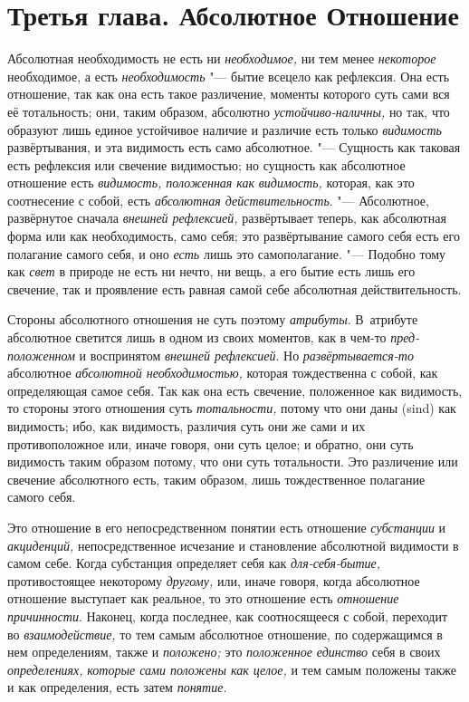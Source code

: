 \chapter[{\em Третья глава} Абсолютное Отношение]{Третья глава. Абсолютное Отношение}

Абсолютная необходимость не есть ни {\em необходимое,} ни тем менее
{\em некоторое} необходимое, а есть
{\em необходимость} "--- бытие всецело как рефлексия. Она
есть отношение, так как она есть такое различение, моменты которого суть
сами вся её тотальность; они, таким образом, абсолютно
{\em устойчиво-наличны,} но так, что образуют лишь
единое устойчивое наличие и различие есть только
{\em видимость} развёртывания, и эта видимость есть
само абсолютное. "--- Сущность как таковая есть рефлексия или свечение
видимостью; но сущность как абсолютное отношение есть
{\em видимость, положенная как
}{\em видимость,} которая, как это соотнесение с собой,
есть {\em абсолютная действительность}. "--- Абсолютное,
развёрнутое сначала {\em внешней рефлексией,}
развёртывает теперь, как абсолютная форма или как необходимость, само себя;
это развёртывание самого себя есть его полагание самого себя, и оно
{\em есть} лишь это самополагание. "--- Подобно тому как
{\em свет} в природе не есть ни нечто, ни вещь, а его
бытие есть лишь его свечение, так и проявление есть равная самой себе
абсолютная действительность.

Стороны абсолютного отношения не суть поэтому {\em атрибуты}. В~атрибуте
абсолютное светится лишь в одном из своих моментов, как в чем-то
{\em пред-положенном} и воспринятом {\em внешней рефлексией}.
Но {\em развёртывается-то} абсолютное {\em абсолютной необходимостью,} которая
тождественна с собой, как определяющая самое себя. Так как она есть свечение,
положенное как видимость, то стороны этого отношения суть {\em тотальности,}
потому что они даны (sind) как видимость; ибо, как видимость, различия суть они
же сами и их противоположное или, иначе говоря, они суть целое; и обратно, они
суть видимость таким образом потому, что они суть тотальности. Это различение
или свечение абсолютного есть, таким образом, лишь тождественное полагание
самого себя.

Это отношение в его непосредственном понятии есть отношение
{\em субстанции} и {\em акциденций,} непосредственное исчезание и
становление абсолютной видимости в самом себе. Когда субстанция определяет
себя как {\em для-себя-бытие,} противостоящее
некоторому {\em другому,} или, иначе говоря, когда
абсолютное отношение выступает как реальное, то это отношение есть
{\em отношение причинности}. Наконец, когда последнее,
как соотносящееся с собой, переходит во
{\em взаимодействие,} то тем самым абсолютное
отношение, по содержащимся в нем определениям, также и
{\em положено;} это {\em положенное
единство} себя в своих {\em определениях,}
{\em которые сами положены как целое,} и тем самым
положены также и как определения, есть затем {\em понятие}.

